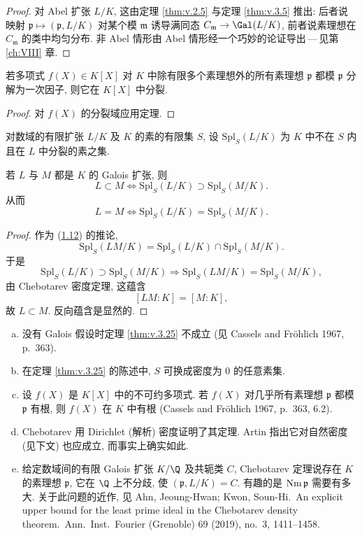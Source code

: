 \begin{proof}
对 Abel 扩张 $L/K$, 这由定理 \ref{thm:v.2.5} 与定理 \ref{thm:v.3.5} 推出: 后者说映射 $\mathfrak{p}\mapsto(\mathfrak{p},L/K)$ 对某个模 $\mathfrak{m}$ 诱导满同态 $C_{\mathfrak{m}}\to\Gal(L/K)$, 前者说素理想在 $C_{\mathfrak{m}}$ 的类中均匀分布. 非 Abel 情形由 Abel 情形经一个巧妙的论证导出\,---\,见第 \ref{ch:VIII} 章.
\end{proof}

\begin{corollary}\label{cor:v.3.24}
若多项式 $f(X)\in K[X]$ 对 $K$ 中除有限多个素理想外的所有素理想 $\mathfrak{p}$ 都模 $\mathfrak{p}$ 分解为一次因子, 则它在 $K[X]$ 中分裂.
\end{corollary}

\begin{proof}
对 $f(X)$ 的分裂域应用定理.
\end{proof}

对数域的有限扩张 $L/K$ 及 $K$ 的素的有限集 $S$, 设 $\mathrm{Spl}_S(L/K)$ 为 $K$ 中不在 $S$ 内且在 $L$ 中分裂的素之集.

\begin{theorem}\label{thm:v.3.25}
若 $L$ 与 $M$ 都是 $K$ 的 Galois 扩张, 则
\[
L\subset M\iff\mathrm{Spl}_S(L/K)\supset\mathrm{Spl}_S(M/K).
\]
从而
\[
L=M\iff\mathrm{Spl}_S(L/K)=\mathrm{Spl}_S(M/K).
\]
\end{theorem}

\begin{proof}
作为 (\hyperlink{item:v.1.12}{1.12}) 的推论,
\[
\mathrm{Spl}_S(LM/K)=\mathrm{Spl}_S(L/K)\cap\mathrm{Spl}_S(M/K).
\]
于是
\[
\mathrm{Spl}_S(L/K)\supset\mathrm{Spl}_S(M/K)\Rightarrow\mathrm{Spl}_S(LM/K)=\mathrm{Spl}_S(M/K),
\]
由 Chebotarev 密度定理, 这蕴含
\[
[LM:K]=[M:K],
\]
故 $L\subset M$. 反向蕴含是显然的.
\end{proof}

\begin{remark}\label{rem:v.3.26}
\begin{enumerate}[(a)]
\item 没有 Galois 假设时定理 \ref{thm:v.3.25} 不成立 (见 Cassels and Fr\"ohlich 1967, p.~363).
\item 在定理 \ref{thm:v.3.25} 的陈述中, $S$ 可换成密度为 $0$ 的任意素集.
\item 设 $f(X)$ 是 $K[X]$ 中的不可约多项式. 若 $f(X)$ 对几乎所有素理想 $\mathfrak{p}$ 都模 $\mathfrak{p}$ 有根, 则 $f(X)$ 在 $K$ 中有根 (Cassels and Fr\"ohlich 1967, p.~363, 6.2).
\item Chebotarev 用 Dirichlet (解析) 密度证明了其定理. Artin 指出它对自然密度 (见下文) 也应成立, 而事实上确实如此.
\item 给定数域间的有限 Galois 扩张 $K/\Q$ 及共轭类 $C$, Chebotarev 定理说存在 $K$ 的素理想 $\mathfrak{p}$, 它在 $\Q$ 上不分歧, 使 $(\mathfrak{p},L/K)=C$. 有趣的是 $\operatorname{Nm}\mathfrak{p}$ 需要有多大.  关于此问题的近作, 见 Ahn, Jeoung-Hwan; Kwon, Soun-Hi.~An explicit upper bound for the least prime ideal in the Chebotarev density theorem.~Ann.~Inst.~Fourier (Grenoble) 69 (2019), no.~3, 1411--1458.
\end{enumerate}
\end{remark}

